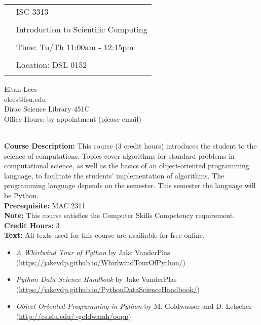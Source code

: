 \documentclass[11pt]{article}
\begin{document}
\begin{tabular}{ l l }
  \multirow{3}{*}{} & \LARGE ISC 3313 \\\\
  & \LARGE Introduction to Scientific Computing \\\\
  & \LARGE Time: Tu/Th 11:00am - 12:15pm \\\\
  & \LARGE Location: DSL 0152 \\\\
\end{tabular}
\vspace{10mm}

\large Eitan Lees\\
\large elees@fsu.edu \\
 \large Dirac Science Library 451C \\
 \large Office Hours: by appointment (please email) \\
\vspace{5mm}

\textbf {\large \\ Course Description:} This course (3 credit hours) introduces the student to the science of computations. Topics cover algorithms for standard problems in computational science, as well as the basics of an object-oriented programming language, to facilitate the students' implementation of algorithms. The programming language depends on the semester. This semester the language will be Python. \\

\textbf {Prerequisite:} MAC 2311\\

\textbf {Note:} This course satisfies the Computer Skills Competency requirement. \\

\textbf {Credit Hours:} 3 \\

\textbf {\large Text:} All texts used for this course are availiable for free online.\\
\begin{itemize}
    \item \textit{A Whirlwind Tour of Python} by Jake VanderPlas \\
(\url{https://jakevdp.github.io/WhirlwindTourOfPython/})\\
    \item \textit{Python Data Science Handbook} by Jake VanderPlas \\
(\url{https://jakevdp.github.io/PythonDataScienceHandbook/})\\
    \item \textit{Object-Oriented Programming in Python} by M. Goldwasser and D. Letscher \\
(\url{http://cs.slu.edu/~goldwamh/oopp}) \\
\end{itemize}
\end{document}
